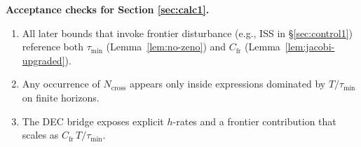 \begin{mdframed}
\textbf{Acceptance checks for Section \ref{sec:calc1}.}
\begin{enumerate}[leftmargin=*]
\item All later bounds that invoke frontier disturbance (e.g., ISS in \S\ref{sec:control1}) reference both $\tau_{\min}$ (Lemma~\ref{lem:no-zeno}) and $C_{\mathrm{fr}}$ (Lemma~\ref{lem:jacobi-upgraded}).
\item Any occurrence of $N_{\mathrm{cross}}$ appears only inside expressions dominated by $T/\tau_{\min}$ on finite horizons.
\item The DEC bridge exposes explicit $h$-rates and a frontier contribution that scales as $C_{\mathrm{fr}}\,T/\tau_{\min}$.
\end{enumerate}
\end{mdframed}

